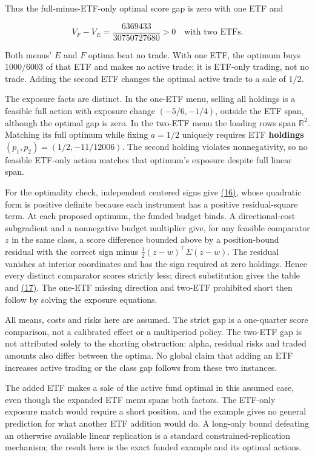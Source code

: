 \documentclass[11pt]{article}
\begin{document}
Thus the full-minus-ETF-only optimal score gap is zero with one ETF and

\begin{equation*}
V_F-V_E=\frac{6369433}{30750727680}>0
\quad\text{with two ETFs}.                                    \tag{17}\label{eq:17}
\end{equation*}

Both menus' \(E\) and \(F\) optima beat no trade. With one ETF, the optimum
buys \(1000/6003\) of that ETF and makes no active trade; it is ETF-only
trading, not no trade. Adding the second ETF changes the optimal active
trade to a sale of \(1/2\).

The exposure facts are distinct. In the one-ETF menu, selling all holdings
is a feasible full action with exposure change \((-5/6,-1/4)\), outside the
ETF span, although the optimal gap is zero. In the two-ETF menu the loading
rows span \(\mathbb R^2\). Matching its full optimum while fixing
\(a=1/2\) uniquely requires ETF \textbf{holdings}
\((p_1,p_2)=(1/2,-11/12006)\). The second holding violates
nonnegativity, so no feasible ETF-only action matches that optimum's
exposure despite full linear span.

For the optimality check, independent centered signs give \hyperref[eq:16]{(16)}, whose
quadratic form is positive definite because each instrument has a positive
residual-square term. At each proposed optimum, the funded budget binds.
A directional-cost subgradient and a nonnegative budget multiplier give,
for any feasible comparator \(z\) in the same class, a score difference
bounded above by a position-bound residual with the correct sign minus
\(\tfrac12(z-w)^\top\Sigma(z-w)\). The residual vanishes at interior
coordinates and has the sign required at zero holdings. Hence every
distinct comparator scores strictly less; direct substitution gives the
table and \hyperref[eq:17]{(17)}. The one-ETF missing direction and two-ETF prohibited short
then follow by solving the exposure equations.

All means, costs and risks here are assumed. The strict gap is a
one-quarter score comparison, not a calibrated effect or a multiperiod
policy. The two-ETF gap is not attributed solely to the shorting
obstruction: alpha, residual risks and traded amounts also differ between
the optima. No global claim that adding an ETF increases active trading
or the class gap follows from these two instances.

The added ETF makes a sale of the active fund optimal in this
assumed case, even though the expanded ETF menu spans both factors.
The ETF-only exposure match would require a short position, and
the example gives no general prediction for what another ETF
addition would do. A long-only bound defeating an otherwise available
linear replication is a standard constrained-replication mechanism;
the result here is the exact funded example and its optimal actions.
\end{document}
